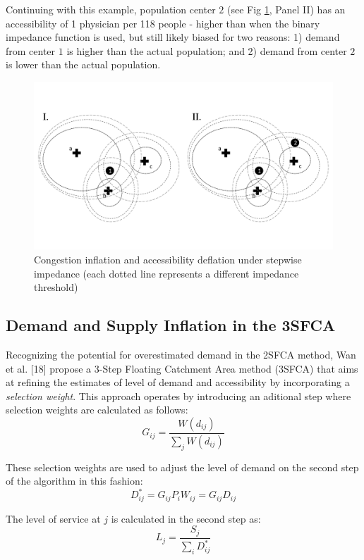 \documentclass[10pt,letterpaper]{article}
\begin{document}
Continuing with this example, population center \(2\) (see Fig
\ref{fig:fig2-example-2}, Panel II) has an accessibility of 1 physician
per 118 people - higher than when the binary impedance function is used,
but still likely biased for two reasons: 1) demand from center \(1\) is
higher than the actual population; and 2) demand from center \(2\) is
lower than the actual population.

\begin{figure}
\centering
\includegraphics{fig2-Example2.pdf}
\caption{\label{fig:fig2-example-2}Congestion inflation and
accessibility deflation under stepwise impedance (each dotted line
represents a different impedance threshold)}
\end{figure}

\subsection{Demand and Supply Inflation in the
3SFCA}\label{demand-and-supply-inflation-in-the-3sfca}

Recognizing the potential for overestimated demand in the 2SFCA method,
Wan et al. {[}18{]} propose a 3-Step Floating Catchment Area method
(3SFCA) that aims at refining the estimates of level of demand and
accessibility by incorporating a \emph{selection weight}. This approach
operates by introducing an aditional step where selection weights are
calculated as follows: \[
G_{ij}=\frac{W(d_{ij})}{\sum_jW(d_{ij})}
\]

These selection weights are used to adjust the level of demand on the
second step of the algorithm in this fashion: \[
D^*_{ij} = G_{ij}P_iW_{ij} = G_{ij}D_{ij}
\]

The level of service at \(j\) is calculated in the second step as: \[
L_j=\frac{S_j}{\sum_iD^*_{ij}}
\]
\end{document}
